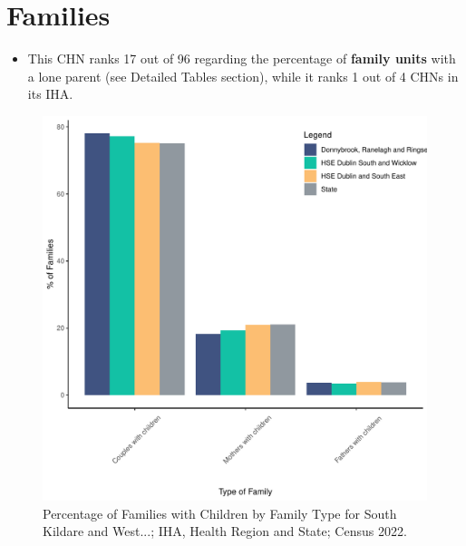 \documentclass{article}
\begin{document}
\section{Families}\label{sect:Fam}
\begin{itemize}
\item This CHN ranks  17 out of 96 regarding the percentage of \textbf{family units} with a lone parent (see Detailed Tables section), while it ranks   1 out of 4 CHNs in its IHA.
\end{itemize}
\begin{figure}[H]
	\centering
	\includegraphics[width = 150mm]{../figures/FamED.pdf}
	\caption{Percentage of Families with Children by Family Type for South Kildare and West...; IHA, Health Region and State; Census 2022.}
	\label{fig:vbnv}
	\end{figure}
	
\end{document}
